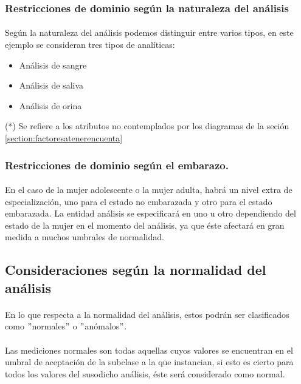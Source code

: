 \documentclass[a4paper,10pt]{article}
\begin{document}
\subsubsection{Restricciones de dominio según la naturaleza del análisis}
\paragraph{}
Según la naturaleza del análisis podemos distinguir entre varios tipos, en este ejemplo se consideran tres tipos de analíticas:
\begin{itemize}
\item Análisis de sangre
\item Análisis de saliva
\item Análisis de orina
\end{itemize}
\vfill
\begin{flushright}

\small
(*) Se refiere a los atributos no contemplados por los diagramas de la seción \ref{section:factoresatenerencuenta}
\end{flushright}

\pagebreak

\subsubsection{Restricciones de dominio según el embarazo.}
\paragraph{}
En el caso de la mujer adolescente o la mujer adulta, habrá un nivel extra de especialización, uno para el estado no embarazada y otro para el estado embarazada. La entidad análisis se especificará en uno u otro dependiendo del estado de la mujer en el momento del análisis, ya que éste afectará en gran medida a muchos umbrales de normalidad.

\subsection{Consideraciones según la normalidad del análisis}
\paragraph{}
En lo que respecta a la normalidad del análisis, estos podrán ser clasificados como $"$normales$"$ o $"$anómalos$"$.
\paragraph{}
Las mediciones normales son todas aquellas cuyos valores se encuentran en el umbral de aceptación de la subclase a la que instancian, si esto es cierto para todos los valores del susodicho análisis, éste será considerado como normal.
\end{document}
